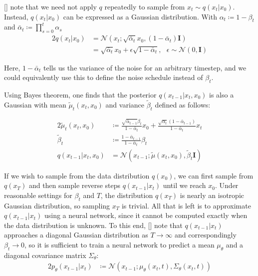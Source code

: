\documentclass{article}
\newcommand{\namecite}[1]{\citeauthor{#1} [\citenum{#1}]}
\begin{document}
\namecite{ddpm} note that we need not apply $q$ repeatedly to sample from $x_t \sim q(x_t|x_0)$. Instead, $q(x_t|x_0)$ can be expressed as a Gaussian distribution. With $\alpha_t \coloneqq 1 - \beta_t$ and $\bar{\alpha}_t \coloneqq \prod_{s=0}^{t} \alpha_s$
%
\begin{alignat}{2}
    q(x_t|x_0) &= \mathcal{N}(x_t; \sqrt{\bar{\alpha}_t} x_0, (1-\bar{\alpha}_t) \mathbf{I}) \\
    &= \sqrt{\bar{\alpha}_t} x_0 + \epsilon \sqrt{1-\bar{\alpha}_t},\text{  } \epsilon \sim \mathcal{N}(0, \mathbf{I}) \label{eq:jumpnoise}
\end{alignat}

Here, $1 - \bar{\alpha}_t$ tells us the variance of the noise for an arbitrary timestep, and we could equivalently use this to define the noise schedule instead of $\beta_t$.

Using Bayes theorem, one finds that the posterior $q(x_{t-1}|x_t,x_0)$ is also a Gaussian with mean $\tilde{\mu}_t(x_t,x_0)$ and variance $\tilde{\beta}_t$ defined as follows:

\begin{alignat}{2}
    \tilde{\mu}_t(x_t,x_0) &\coloneqq \frac{\sqrt{\bar{\alpha}_{t-1}}\beta_t}{1-\bar{\alpha}_t}x_0 + \frac{\sqrt{\alpha_t}(1-\bar{\alpha}_{t-1})}{1-\bar{\alpha}_t} x_t \label{eq:mutilde} \\
    \tilde{\beta}_t &\coloneqq \frac{1-\bar{\alpha}_{t-1}}{1-\bar{\alpha}_t} \beta_t \label{eq:betatilde} \\
    q(x_{t-1}|x_t,x_0) &= \mathcal{N}(x_{t-1}; \tilde{\mu}(x_t, x_0), \tilde{\beta}_t \mathbf{I}) \label{eq:posterior}
\end{alignat}

If we wish to sample from the data distribution $q(x_0)$, we can first sample from $q(x_T)$ and then sample reverse steps $q(x_{t-1}|x_t)$ until we reach $x_0$. Under reasonable settings for $\beta_t$ and $T$, the distribution $q(x_T)$ is nearly an isotropic Gaussian distribution, so sampling $x_T$ is trivial. All that is left is to approximate $q(x_{t-1}|x_t)$ using a neural network, since it cannot be computed exactly when the data distribution is unknown. To this end, \namecite{dickstein} note that $q(x_{t-1}|x_t)$ approaches a diagonal Gaussian distribution as $T \to \infty$ and correspondingly $\beta_t \to 0$, so it is sufficient to train a neural network to predict a mean $\mu_{\theta}$ and a diagonal covariance matrix $\Sigma_{\theta}$:
%
\begin{alignat}{2}
p_{\theta}(x_{t-1}|x_t) &\coloneqq \mathcal{N}(x_{t-1};\mu_{\theta}(x_t, t), \Sigma_{\theta}(x_t, t)) \label{eq:ptheta}
\end{alignat}
\end{document}
